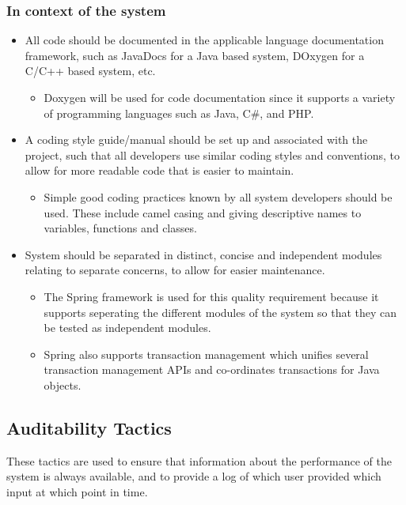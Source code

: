 \documentclass[a4paper,10pt]{article}
\begin{document}
	\subsubsection{In context of the system} 
		\begin{itemize}
			\item All code should be documented in the applicable language documentation framework, such as JavaDocs for a Java based system, DOxygen for a C/C++ based system, etc.
				\begin{itemize}
					\item Doxygen will be used for code documentation since it supports a variety of programming languages such as Java, C\#, and PHP. 
				\end{itemize}
			\item A coding style guide/manual should be set up and associated with the project, such that all developers use similar coding styles and conventions, to allow for more readable code that is easier to maintain.
				\begin{itemize}
					\item Simple good coding practices known by all system developers should be used. These include camel casing and giving descriptive names to variables, functions and classes. 
				\end{itemize}
			\item System should be separated in distinct, concise and independent modules relating to separate concerns, to allow for easier maintenance.
				\begin{itemize}
					\item The Spring framework is used for this quality requirement because it supports seperating the different modules of the system so that they can be tested as independent modules. 
					\item Spring also supports transaction management which unifies several transaction management APIs and co-ordinates transactions for Java objects.
				\end{itemize}
		\end{itemize}

\subsection{Auditability Tactics}
	These tactics are used to ensure that information about the performance of the system is always available, and to provide a log of which user provided which input at which point in time. 
	
\end{document}
